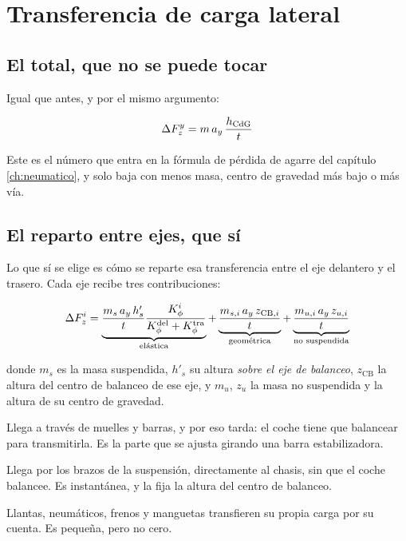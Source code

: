 \section{Transferencia de carga lateral}
\label{sec:regimen_estacionario:03}

\subsection{El total, que no se puede tocar}

Igual que antes, y por el mismo argumento:

\begin{equation}
  \Delta F_z^{y} = m\,a_y\,\frac{h_{\mathrm{CdG}}}{t}
  \label{eq:transferencia_lat}
\end{equation}

Este es el número que entra en la fórmula de pérdida de agarre del capítulo
\ref{ch:neumatico}, y solo baja con menos masa, centro de gravedad más bajo o
más vía.

\subsection{El reparto entre ejes, que sí}

Lo que sí se elige es cómo se reparte esa transferencia entre el eje delantero
y el trasero. Cada eje recibe tres contribuciones:

\begin{equation}
  \Delta F_z^{i} =
  \underbrace{\frac{m_s\,a_y\,h'_s}{t}
              \frac{K_{\phi}^{i}}{K_{\phi}^{\text{del}}+K_{\phi}^{\text{tra}}}}
             _{\text{elástica}}
  + \underbrace{\frac{m_{s,i}\,a_y\,z_{\text{CB},i}}{t}}_{\text{geométrica}}
  + \underbrace{\frac{m_{u,i}\,a_y\,z_{u,i}}{t}}_{\text{no suspendida}}
  \label{eq:transferencia_tres_terminos}
\end{equation}

donde $m_s$ es la masa suspendida, $h'_s$ su altura \emph{sobre el eje de
balanceo}, $z_{\text{CB}}$ la altura del centro de balanceo de ese eje, y
$m_u$, $z_u$ la masa no suspendida y la altura de su centro de gravedad.

\begin{description}[leftmargin=0pt,labelsep=0pt,style=nextline]
  \item[Elástica] Llega a través de muelles y barras, y por eso tarda: el coche
    tiene que balancear para transmitirla. Es la parte que se ajusta girando
    una barra estabilizadora.
  \item[Geométrica] Llega por los brazos de la suspensión, directamente al
    chasis, sin que el coche balancee. Es instantánea, y la fija la altura del
    centro de balanceo.
  \item[No suspendida] Llantas, neumáticos, frenos y manguetas transfieren su
    propia carga por su cuenta. Es pequeña, pero no cero.
\end{description}

